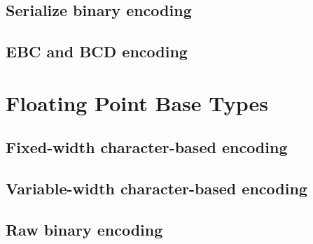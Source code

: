\subsection{Serialize binary encoding}

\sbBegin{}
\bEnd{}


\subsection{EBC and BCD encoding}

\cBegin{}
\cEnd{}


\section{Floating Point Base Types}

\subsection{Fixed-width character-based encoding}

\aedBegin{}
\aedEnd{}

\begin{tinycodeaux}{\leftmargin=0in}
\end{tinycodeaux}

\subsection{Variable-width character-based encoding}

\aedBegin{}
\aedEnd{}

\begin{tinycodeaux}{\leftmargin=0in}
\end{tinycodeaux}

\subsection{Raw binary encoding}

\bBegin{}
\bEnd{}

\begin{tinycodeaux}{\leftmargin=0in}
\end{tinycodeaux}

